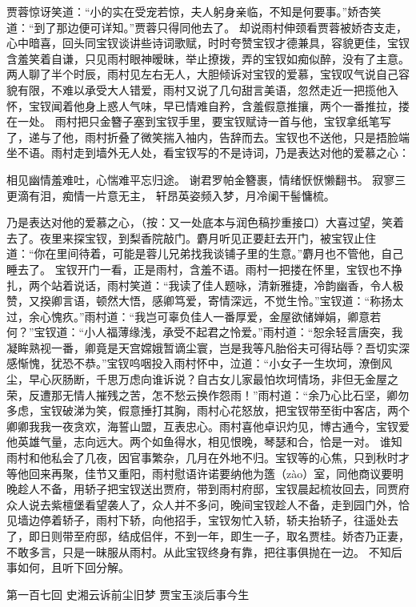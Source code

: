 \documentclass[12pt,oneside]{book}
\begin{document}
贾蓉惊讶笑道：“小的实在受宠若惊，夫人躬身亲临，不知是何要事。”娇杏笑道：“到了那边便可详知。”贾蓉只得同他去了。
却说雨村伸颈看贾蓉被娇杏支走，心中暗喜，回头同宝钗谈讲些诗词歌赋，时时夸赞宝钗才德兼具，容貌更佳，宝钗含羞笑着自谦，只见雨村眼神暧昧，举止撩拨，弄的宝钗如痴似醉，没有了主意。两人聊了半个时辰，雨村见左右无人，大胆倾诉对宝钗的爱慕，宝钗叹气说自己容貌有限，不难以承受大人错爱，雨村又说了几句甜言美语，忽然走近一把揽他入怀，宝钗闻着他身上惑人气味，早已情难自矜，含羞假意推攘，两个一番推拉，搂在一处。
雨村把只金簪子塞到宝钗手里，要宝钗赋诗一首与他，宝钗拿纸笔写了，递与了他，雨村折叠了微笑揣入袖内，告辞而去。宝钗也不送他，只是捂脸端坐不语。雨村走到墙外无人处，看宝钗写的不是诗词，乃是表达对他的爱慕之心：

相见幽情羞难吐，心惴难平忘归途。
谢君罗帕金簪裹，情绪恹恹懒翻书。
寂寥三更滴有泪，痴情一片意无主，
轩昂英姿频入梦，月冷阑干髻慵梳。

乃是表达对他的爱慕之心，（按：又一处底本与润色稿抄重接口）大喜过望，笑着去了。夜里来探宝钗，到梨香院敲门。麝月听见正要赶去开门，被宝钗止住道：“你在里间待着，可能是蓉儿兄弟找我谈铺子里的生意。”麝月也不管他，自己睡去了。
宝钗开门一看，正是雨村，含羞不语。雨村一把搂在怀里，宝钗也不挣扎，两个站着说话，雨村笑道：“我读了佳人题咏，清新雅捷，冷韵幽香，令人极赞，又揆卿言语，顿然大悟，感卿笃爱，寄情深远，不觉生怜。”宝钗道：“称扬太过，余心愧疚。”雨村道：“我岂可辜负佳人一番厚爱，金屋欲储婵娟，卿意若何？”宝钗道：“小人福薄缘浅，承受不起君之怜爱。”雨村道：“恕余轻言唐突，我凝眸熟视一番，卿竟是天宫嫦娥暂谪尘寰，岂是我等凡胎俗夫可得玷辱？吾切实深感惭愧，犹恐不恭。”宝钗呜咽投入雨村怀中，泣道：“小女子一生坎坷，潦倒风尘，早心灰肠断，千思万虑向谁诉说？自古女儿家最怕坎坷情场，非但无金屋之荣，反遭那无情人摧残之苦，怎不愁云换作怨雨！”雨村道：“余乃心比石坚，卿勿多虑，宝钗破涕为笑，假意捶打其胸，雨村心花怒放，把宝钗带至街中客店，两个卿卿我我一夜贪欢，海誓山盟，互表忠心。雨村喜他卓识灼见，博古通今，宝钗爱他英雄气量，志向远大。两个如鱼得水，相见恨晚，琴瑟和合，恰是一对。
谁知雨村和他私会了几夜，因官事繁杂，几月在外地不归。宝钗等的心焦，只到秋时才等他回来再聚，佳节又重阳，雨村慰语许诺要纳他为簉（zào）室，同他商议要明晚趁人不备，用轿子把宝钗送出贾府，带到雨村府邸，宝钗晨起梳妆回去，同贾府众人说去紫檀堡看望袭人了，众人并不多问，晚间宝钗趁人不备，走到园门外，恰见墙边停着轿子，雨村下轿，向他招手，宝钗匆忙入轿，轿夫抬轿子，往遥处去了，即日则带至府邸，结成侣伴，不到一年，即生一子，取名贾桂。娇杏乃正妻，不敢多言，只是一昧服从雨村。从此宝钗终身有靠，把往事俱抛在一边。
不知后事如何，且听下回分解。
 
 
第一百七回 史湘云诉前尘旧梦 贾宝玉淡后事今生
\end{document}
